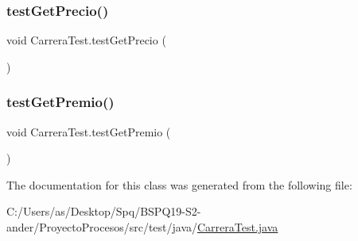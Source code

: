 \mbox{\label{class_carrera_test_abbedc0671839401d1312ddf20b60a48f}} 
\subsubsection{\texorpdfstring{testGetPrecio()}{testGetPrecio()}}
{\footnotesize\ttfamily void Carrera\+Test.\+test\+Get\+Precio (\begin{DoxyParamCaption}{ }\end{DoxyParamCaption})}

\mbox{\label{class_carrera_test_a98adb151ad831f74469b79f1c9f3c43f}} 
\subsubsection{\texorpdfstring{testGetPremio()}{testGetPremio()}}
{\footnotesize\ttfamily void Carrera\+Test.\+test\+Get\+Premio (\begin{DoxyParamCaption}{ }\end{DoxyParamCaption})}



The documentation for this class was generated from the following file\+:\begin{DoxyCompactItemize}
\item 
C\+:/\+Users/as/\+Desktop/\+Spq/\+B\+S\+P\+Q19-\/\+S2-\/ander/\+Proyecto\+Procesos/src/test/java/\mbox{\hyperlink{_carrera_test_8java}{Carrera\+Test.\+java}}\end{DoxyCompactItemize}
